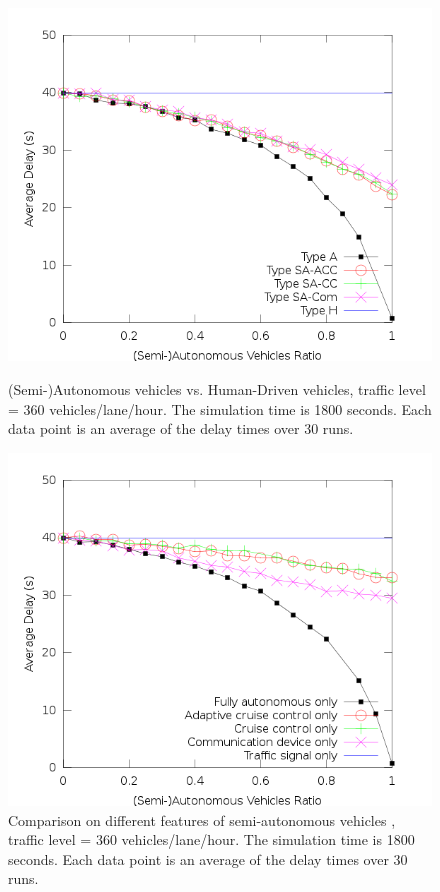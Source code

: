 
\begin{figure}

\centering
\includegraphics[width=0.8\columnwidth]{figures/figure_2.png}
\caption{(Semi-)Autonomous vehicles vs. Human-Driven vehicles, traffic
level = 360 vehicles/lane/hour. The simulation time is 1800 seconds.
Each data point is an average of the delay times over 30 runs.}
\label{fig:figure2}

\centering
\includegraphics[width=0.8\columnwidth]{figures/figure_1.png}
\caption{Comparison on different features of semi-autonomous vehicles
, traffic level = 360 vehicles/lane/hour. The simulation time is 1800
seconds. Each data point is an average of the delay times over 30 runs.}
\label{fig:figure1}

\mbox{}

\end{figure}

